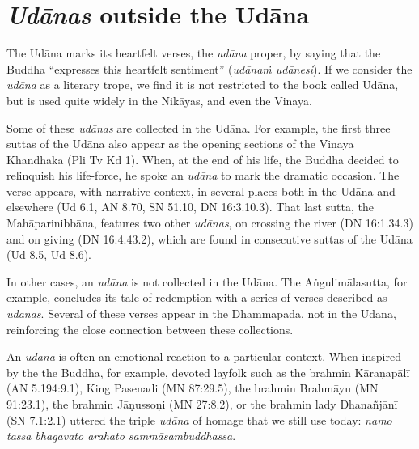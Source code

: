 \documentclass[12pt,openany]{book}%
\begin{document}
\section*{\textit{\textsanskrit{Udānas}} outside the \textsanskrit{Udāna}}

The \textsanskrit{Udāna} marks its heartfelt verses, the \textit{\textsanskrit{udāna}} proper, by saying that the Buddha “expresses this heartfelt sentiment” (\textit{\textsanskrit{udānaṁ} \textsanskrit{udānesi}}). If we consider the \textit{\textsanskrit{udāna}} as a literary trope, we find it is not restricted to the book called \textsanskrit{Udāna}, but is used quite widely in the \textsanskrit{Nikāyas}, and even the Vinaya. 

Some of these \textit{\textsanskrit{udānas}} are collected in the \textsanskrit{Udāna}. For example, the first three suttas of the \textsanskrit{Udāna} also appear as the opening sections of the Vinaya Khandhaka (Pli Tv Kd 1). When, at the end of his life, the Buddha decided to relinquish his life-force, he spoke an \textit{\textsanskrit{udāna}} to mark the dramatic occasion. The verse appears, with narrative context, in several places both in the \textsanskrit{Udāna} and elsewhere (Ud 6.1, AN 8.70, SN 51.10, DN 16:3.10.3). That last sutta, the \textsanskrit{Mahāparinibbāna}, features two other \textit{\textsanskrit{udānas}}, on crossing the river (DN 16:1.34.3) and on giving (DN 16:4.43.2), which are found in consecutive suttas of the \textsanskrit{Udāna} (Ud 8.5, Ud 8.6).

In other cases, an \textit{\textsanskrit{udāna}} is not collected in the \textsanskrit{Udāna}. The \textsanskrit{Aṅgulimālasutta}, for example, concludes its tale of redemption with a series of verses described as \textit{\textsanskrit{udānas}}. Several of these verses appear in the Dhammapada, not in the \textsanskrit{Udāna}, reinforcing the close connection between these collections.

An \textit{\textsanskrit{udāna}} is often an emotional reaction to a particular context. When inspired by the the Buddha, for example, devoted layfolk such as the brahmin \textsanskrit{Kāraṇapālī}  (AN 5.194:9.1), King Pasenadi (MN 87:29.5), the brahmin \textsanskrit{Brahmāyu} (MN 91:23.1), the brahmin \textsanskrit{Jāṇussoṇi} (MN 27:8.2), or the brahmin lady \textsanskrit{Dhanañjānī} (SN 7.1:2.1) uttered the triple \textit{\textsanskrit{udāna}} of homage that we still use today: \textit{namo tassa bhagavato arahato \textsanskrit{sammāsambuddhassa}}. 
\end{document}
